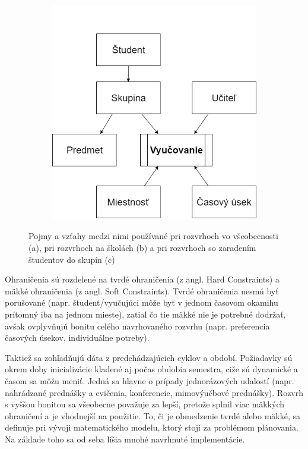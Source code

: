 \begin{figure}[ht]
\begin{subfigure}{.45\textwidth}
  \includegraphics[width=.9\linewidth]{img/koncepty3.png}
  \caption{\label{fig:concepts3}}
\end{subfigure}
\caption{Pojmy a vzťahy medzi nimi používané pri rozvrhoch vo všeobecnosti (a),
pri rozvrhoch na školách (b) a pri rozvrhoch so zaradením študentov do skupín (c) \cite{willemen}}
\label{fig:concepts}
\end{figure}

Ohraničenia sú rozdelené na tvrdé ohraničenia (z angl. Hard Constraints) a mäkké
ohraničenia (z angl. Soft Constraints). Tvrdé ohraničenia nesmú byť porušované
(napr. študent/vyučujúci môže byť v jednom časovom okamihu prítomný iba na
jednom mieste), zatiaľ čo tie mäkké nie je potrebné dodržať, avšak ovplyvňujú
bonitu celého navrhovaného rozvrhu (napr. preferencia časových úsekov, individuálne potreby). \cite{lukac}

Taktiež sa zohľadňujú dáta z predchádzajúcich cyklov a období. Požiadavky sú okrem
doby inicializácie kladené aj počas obdobia semestra, ciže sú dynamické a časom sa môžu
meniť. Jedná sa hlavne o prípady jednorázových udalostí (napr. nahrádzané prednášky
a cvičenia, konferencie, mimovýučbové prednášky). Rozvrh s vyššou bonitou sa všeobecne
považuje za lepší, pretože splnil viac mäkkých ohraničení a je vhodnejší na použitie.
To, či je obmedzenie tvrdé alebo mäkké, sa definuje pri vývoji matematického modelu,
ktorý stojí za problémom plánovania. Na základe toho sa od seba líšia mnohé navrhnuté
implementácie.


